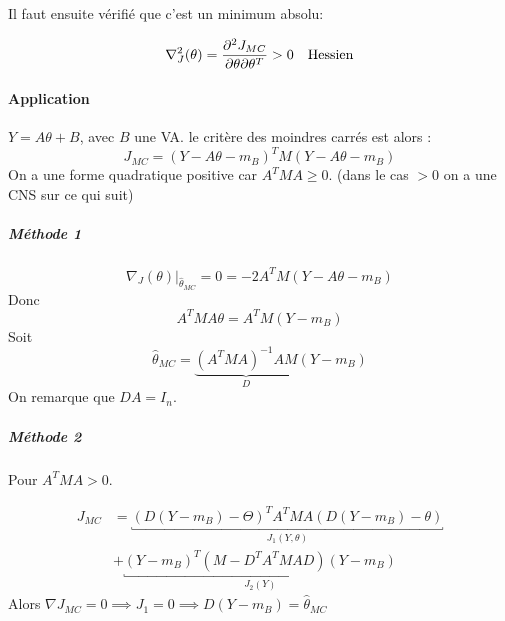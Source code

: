 \documentclass[main.tex]{subfiles}
\begin{document}
Il faut ensuite vérifié que c'est un minimum absolu:

\[
 \nabla^2_{J}(\theta) = \derivp[{}^2J_{MC}]{\theta\partial\theta^T} > 0 \quad \text{Hessien}
\]


\paragraph{Application}  $Y = A\theta{} + B$, avec $B$ une VA.
le critère des moindres carrés est alors :
\[
J_{MC} = (Y-A\theta-m_B)^TM (Y-A\theta-m_B)
\]
On a une forme quadratique  positive  car $A^TMA \geq0 $. (dans le cas $>0$  on a une CNS sur ce qui suit)
\subparagraph{Méthode 1}
\[
  \left.\nabla_J(\theta)\right|_{\hat{\theta}_{MC}} = 0  = -2 A^TM(Y-A\theta-m_B)
\]
Donc
\[
A^TMA \theta = A^TM(Y-m_B)
\]
Soit \[
  \boxed{\hat{\theta}_{MC} = \underbrace{(A^TMA)^{-1}AM}_{D}(Y-m_B)}
\]
On remarque que $DA = I_n$.
\subparagraph{Méthode 2} Pour $A^TMA>0$.

\[
  \begin{aligned}
    J_{MC} &= \underbracket{(D(Y-m_B)-\Theta)^TA^TMA(D(Y-m_B)-\theta)}_ {J_1(Y,\theta)}\\
    &+ \underbracket{(Y-m_B)^T(M-D^TA^TMAD)(Y-m_B)}_{J_2(Y)}
\end{aligned}
\]
Alors $\nabla J_{MC} = 0  \implies J_1 = 0 \implies D(Y-m_B) = \hat{\theta}_{MC}$
\end{document}
